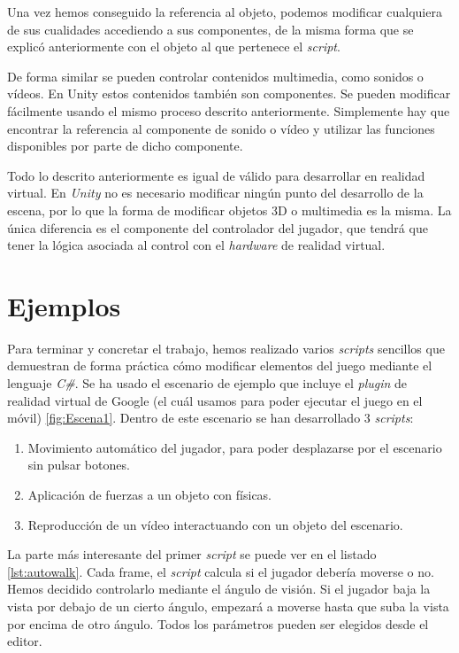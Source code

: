\documentclass{pre-tfg}
\begin{document}
Una vez hemos conseguido la referencia al objeto, podemos modificar cualquiera de sus cualidades accediendo a sus componentes, de la misma forma que se explicó anteriormente con el objeto al que pertenece el \textit{script}. 

De forma similar se pueden controlar contenidos multimedia, como sonidos o vídeos. En Unity estos contenidos también son componentes. Se pueden modificar fácilmente usando el mismo proceso descrito anteriormente. Simplemente hay que encontrar la referencia al componente de sonido o vídeo y utilizar las funciones disponibles por parte de dicho componente.

Todo lo descrito anteriormente es igual de válido para desarrollar en realidad virtual. En \textit{Unity} no es necesario modificar ningún punto del desarrollo de la escena, por lo que la forma de modificar objetos 3D o multimedia es la misma. La única diferencia es el componente del controlador del jugador, que tendrá que tener la lógica asociada al control con el \textit{hardware} de realidad virtual.

\section{Ejemplos}

Para terminar y concretar el trabajo, hemos realizado varios \textit{scripts} sencillos que demuestran de forma práctica cómo modificar elementos del juego mediante el lenguaje \textit{C\#}. Se ha usado el escenario de ejemplo que incluye el \textit{plugin} de realidad virtual de Google (el cuál usamos para poder ejecutar el juego en el móvil) \ref{fig:Escena1}. Dentro de este escenario se han desarrollado 3 \textit{scripts}:

\begin{enumerate}
\item Movimiento automático del jugador, para poder desplazarse por el escenario sin pulsar botones.
\item Aplicación de fuerzas a un objeto con físicas.
\item Reproducción de un vídeo interactuando con un objeto del escenario.
\end{enumerate}

La parte más interesante del primer \textit{script} se puede ver en el listado \ref{lst:autowalk}. Cada frame, el \textit{script} calcula si el jugador debería moverse o no. Hemos decidido controlarlo mediante el ángulo de visión. Si el jugador baja la vista por debajo de un cierto ángulo, empezará a moverse hasta que suba la vista por encima de otro ángulo. Todos los parámetros pueden ser elegidos desde el editor.
\end{document}
